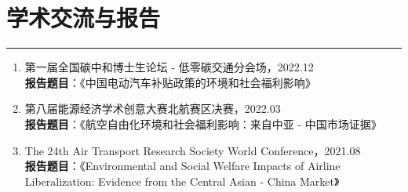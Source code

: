 \documentclass[letterpaper]{article}
\begin{document}
\section*{学术交流与报告}
\hrule
\vspace{0.25cm}
  \begin{enumerate}
    \item 第一届全国碳中和博士生论坛 - 低零碳交通分会场，2022.12 \\
    \textbf{报告题目}：《中国电动汽车补贴政策的环境和社会福利影响》
    \item 第八届能源经济学术创意大赛北航赛区决赛，2022.03 \\
    \textbf{报告题目}：《航空自由化环境和社会福利影响：来自中亚 - 中国市场证据》
    \item The 24th Air Transport Research Society World Conference，2021.08 \\
    \textbf{报告题目}：《Environmental and Social Welfare Impacts of Airline Liberalization: Evidence from the Central Asian - China Market》
  \end{enumerate}
\end{document}
